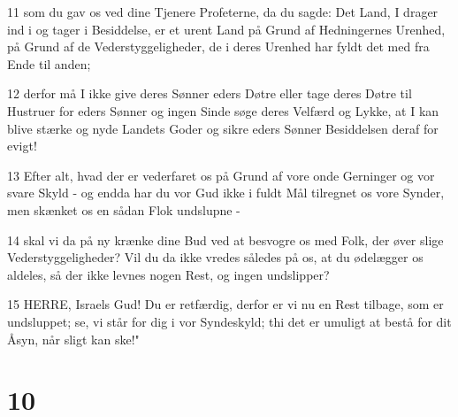 \par 11 som du gav os ved dine Tjenere Profeterne, da du sagde: Det Land, I drager ind i og tager i Besiddelse, er et urent Land på Grund af Hedningernes Urenhed, på Grund af de Vederstyggeligheder, de i deres Urenhed har fyldt det med fra Ende til anden;
\par 12 derfor må I ikke give deres Sønner eders Døtre eller tage deres Døtre til Hustruer for eders Sønner og ingen Sinde søge deres Velfærd og Lykke, at I kan blive stærke og nyde Landets Goder og sikre eders Sønner Besiddelsen deraf for evigt!
\par 13 Efter alt, hvad der er vederfaret os på Grund af vore onde Gerninger og vor svare Skyld - og endda har du vor Gud ikke i fuldt Mål tilregnet os vore Synder, men skænket os en sådan Flok undslupne -
\par 14 skal vi da på ny krænke dine Bud ved at besvogre os med Folk, der øver slige Vederstyggeligheder? Vil du da ikke vredes således på os, at du ødelægger os aldeles, så der ikke levnes nogen Rest, og ingen undslipper?
\par 15 HERRE, Israels Gud! Du er retfærdig, derfor er vi nu en Rest tilbage, som er undsluppet; se, vi står for dig i vor Syndeskyld; thi det er umuligt at bestå for dit Åsyn, når sligt kan ske!"

\chapter{10}

